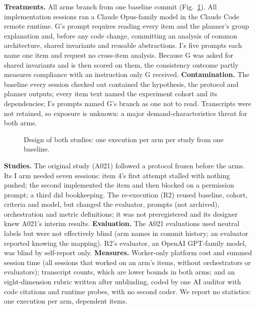 \documentclass[10pt,conference]{IEEEtran}
\newcommand{\G}{G}
\newcommand{\I}{I}
\begin{document}
\textbf{Treatments.} All arms branch from one baseline commit (Fig.~\ref{fig:design}). All implementation sessions ran a Claude Opus-family model in the Claude Code remote runtime. %
\G's prompt requires reading every item and the planner's group explanation and, before any code change, committing an analysis of common architecture, shared invariants and reusable abstractions. \I's five prompts each name one item and request no cross-item analysis. %
Because \G{} was asked for shared invariants and is then scored on them, the consistency outcome partly measures compliance with an instruction only \G{} received. %
\textbf{Contamination.} The baseline every session checked out contained the hypothesis, the protocol and planner outputs; every item text named the experiment cohort and its dependencies; \I's prompts named \G's branch as one not to read. Transcripts were not retained, so exposure is unknown: a major demand-characteristics threat for both arms. %

\begin{figure}[t]
\centering

\caption{Design of both studies: one execution per arm per study from one baseline.}
\label{fig:design}
\end{figure}

\textbf{Studies.} The original study (A021) followed a protocol frozen before the arms. %
Its \I{} arm needed seven sessions: item 4's first attempt stalled with nothing pushed; the second implemented the item and then blocked on a permission prompt; a third did bookkeeping. %
The re-execution (R2) reused baseline, cohort, criteria and model, but changed the evaluator, prompts (not archived), orchestration and metric definitions; it was not preregistered and its designer knew A021's interim results. %
\textbf{Evaluation.} The A021 evaluations used neutral labels but were not effectively blind (arm names in commit history; an evaluator reported knowing the mapping). R2's evaluator, an OpenAI GPT-family model, was blind by self-report only. %
\textbf{Measures.} Worker-only platform cost and summed session time (all sessions that worked on an arm's items, without orchestrators or evaluators); transcript counts, which are lower bounds in both arms; and an eight-dimension rubric written after unblinding, coded by one AI auditor with code citations and runtime probes, with no second coder. %
We report no statistics: one execution per arm, dependent items.
\end{document}
